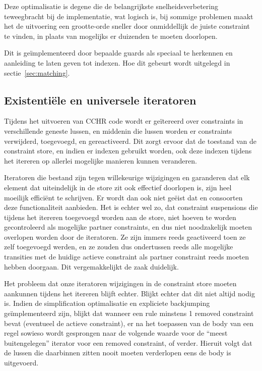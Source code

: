 Deze optimalisatie is degene die de belangrijkste snelheidsverbetering teweegbracht bij de implementatie, wat logisch is, bij sommige problemen maakt het de uitvoering een grootte-orde sneller door onmiddellijk de juiste constraint te vinden, in plaats van mogelijks er duizenden te moeten doorlopen.

Dit is ge\"implementeerd door bepaalde guards als speciaal te herkennen en aanleiding te laten geven tot indexen. Hoe dit gebeurt wordt uitgelegd in sectie~\ref{sec:matching}.
 
\subsection{Existenti\"ele en universele iteratoren} \label{sec:gencode-iter}

Tijdens het uitvoeren van CCHR code wordt er ge\"itereerd over constraints in verschillende geneste lussen, en middenin die lussen worden er constraints verwijderd, toegevoegd, en gereactiveerd. Dit zorgt ervoor dat de toestand van de constraint store, en indien er indexen gebruikt worden, ook deze indexen tijdens het itereren op allerlei mogelijke manieren kunnen veranderen.

Iteratoren die bestand zijn tegen willekeurige wijzigingen en garanderen dat elk element dat uiteindelijk in de store zit ook effectief doorlopen is, zijn heel moeilijk effici\"ent te schrijven. Er wordt dan ook niet ge\"eist dat  en consoorten deze functionaliteit aanbieden. Het is echter wel zo, dat constraint suspensions die tijdens het itereren toegevoegd worden aan de store, niet hoeven te worden gecontroleerd als mogelijke partner constraints, en dus niet noodzakelijk moeten overlopen worden door de iteratoren. Ze zijn immers reeds geactiveerd toen ze zelf toegevoegd werden, en ze zouden dus ondertussen reeds alle mogelijke transities met de huidige actieve constraint als partner constraint reeds moeten hebben doorgaan. Dit vergemakkelijkt de zaak duidelijk.

Het probleem dat onze iteratoren wijzigingen in de constraint store moeten aankunnen tijdens het itereren blijft echter. Blijkt echter dat dit niet altijd nodig is. Indien de simplification optimalisatie en expliciete backjumping ge\"implementeerd zijn, blijkt dat wanneer een rule minstens 1 removed constraint bevat (eventueel de actieve constraint), er na het toepassen van de body van een regel sowieso wordt gesprongen naar de volgende waarde voor de ``meest buitengelegen'' iterator voor een removed constraint, of verder. Hieruit volgt dat de lussen die daarbinnen zitten nooit moeten verderlopen eens de body is uitgevoerd.

